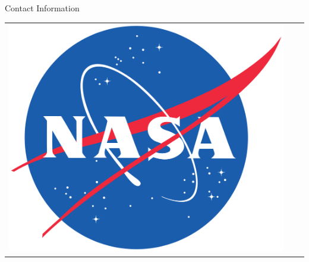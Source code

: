 \documentclass[final]{beamer}
\newlength{\onecolwid}
\begin{document}
\begin{frame}[t]
\begin{columns}[t]
\begin{column}{\onecolwid}
\begin{alertblock}{Contact Information}
\end{alertblock}

\begin{center}
\begin{tabular}{ccc}
\includegraphics[width=0.4\linewidth]{NASA_logo.png} & \hfill 
\end{tabular}
\end{center}


\end{column} %

\end{columns} %

\end{frame} %
\end{document}
